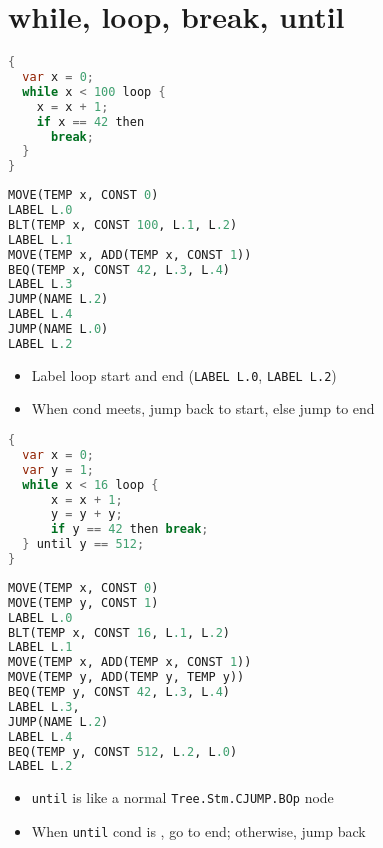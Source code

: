 \section*{while, loop, break, until}
\begin{minipage}{.4\linewidth}
\begin{lstlisting}[language=Java, morekeywords={loop, then},
frame=none,xleftmargin=-6pt]
{
  var x = 0;
  while x < 100 loop {
    x = x + 1;
    if x == 42 then
      break;
  }
}
\end{lstlisting}
\end{minipage}
\begin{minipage}{.6\linewidth}
\begin{lstlisting}[language=Python,frame=none,xleftmargin=-8pt]
MOVE(TEMP x, CONST 0)
LABEL L.0
BLT(TEMP x, CONST 100, L.1, L.2)
LABEL L.1
MOVE(TEMP x, ADD(TEMP x, CONST 1))
BEQ(TEMP x, CONST 42, L.3, L.4)
LABEL L.3
JUMP(NAME L.2)
LABEL L.4
JUMP(NAME L.0)
LABEL L.2
\end{lstlisting}
\end{minipage}
\begin{itemize}
\item Label loop start and end (\texttt{LABEL L.0}, \texttt{LABEL L.2})
\item When cond meets, jump back to start, else jump to end
\end{itemize}
\begin{minipage}{.4\linewidth}
\begin{lstlisting}[language=Java,morekeywords={loop,then,until,var},
frame=none,xleftmargin=-6pt]
{
  var x = 0;
  var y = 1;
  while x < 16 loop {
      x = x + 1;
      y = y + y;
      if y == 42 then break;
  } until y == 512;
}
\end{lstlisting}
\end{minipage}
\begin{minipage}{.6\linewidth}
\begin{lstlisting}[language=Python,frame=none,xleftmargin=-8pt]
MOVE(TEMP x, CONST 0)
MOVE(TEMP y, CONST 1)
LABEL L.0
BLT(TEMP x, CONST 16, L.1, L.2)
LABEL L.1
MOVE(TEMP x, ADD(TEMP x, CONST 1))
MOVE(TEMP y, ADD(TEMP y, TEMP y))
BEQ(TEMP y, CONST 42, L.3, L.4)
LABEL L.3,
JUMP(NAME L.2)
LABEL L.4
BEQ(TEMP y, CONST 512, L.2, L.0)
LABEL L.2
\end{lstlisting}
\end{minipage}
\begin{itemize}
\item \texttt{until} is like a normal \texttt{Tree.Stm.CJUMP.BOp} node
\item When \texttt{until} cond is , go to end; otherwise, jump back
\end{itemize}

